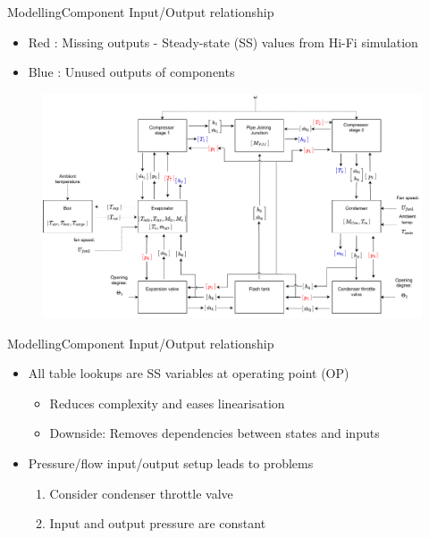 
\begin{frame}{Modelling}{Component Input/Output relationship}
	\begin{itemize}
		\item \color{red} Red \color{black}: Missing outputs - Steady-state (SS) values from Hi-Fi simulation
		\item \color{blue} Blue \color{black}: Unused outputs of components
	\end{itemize}
	\begin{figure}[h!]
		\centering
		\includegraphics[width=1\textwidth]{../Graphics/Block_Diagram_inout_flowValveVersion.pdf}
		\label{fig:Block_diagram_inout}
	\end{figure}
	
\end{frame}


\begin{frame}{Modelling}{Component Input/Output relationship}
	\begin{itemize}
		\item All table lookups are SS variables at operating point (OP)
			\begin{itemize}
				\item Reduces complexity and eases linearisation
				\item Downside: Removes dependencies between states and inputs
			\end{itemize}
		\item Pressure/flow input/output setup leads to problems
			\begin{enumerate}
				\item Consider condenser throttle valve
				\item Input and output pressure are constant
			\end{enumerate}
	\end{itemize}
\end{frame}




